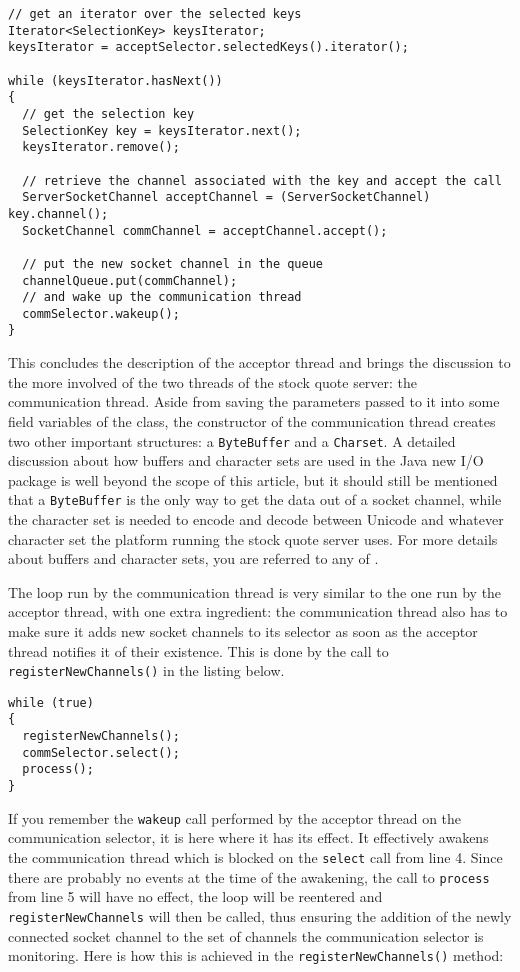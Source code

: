 \documentclass[a4paper,10pt]{article}
\begin{document}
\begin{lstlisting}
// get an iterator over the selected keys
Iterator<SelectionKey> keysIterator;
keysIterator = acceptSelector.selectedKeys().iterator();

while (keysIterator.hasNext())
{
  // get the selection key
  SelectionKey key = keysIterator.next();
  keysIterator.remove();

  // retrieve the channel associated with the key and accept the call
  ServerSocketChannel acceptChannel = (ServerSocketChannel) key.channel();
  SocketChannel commChannel = acceptChannel.accept();

  // put the new socket channel in the queue
  channelQueue.put(commChannel);
  // and wake up the communication thread
  commSelector.wakeup();
}
\end{lstlisting}

This concludes the description of the acceptor thread and brings the discussion to the more involved of the two
threads of the stock quote server: the communication thread. Aside from saving the parameters passed to it into
some field variables of the class, the constructor of the communication thread creates two other important structures:
a \texttt{ByteBuffer} and a \texttt{Charset}. A detailed discussion about how buffers and character sets are used in
the Java new I/O package is well beyond the scope of this article, but it should still be mentioned that a \texttt{ByteBuffer}
is the only way to get the data out of a socket channel, while the character set is needed to encode and decode
between Unicode and whatever character set the platform running the stock quote server uses. For more details
about buffers and character sets, you are referred to any of \cite{eckel98thinking, javadoc}.

The loop run by the communication thread is very similar to the one run by the acceptor thread, with one extra ingredient:
the communication thread also has to make sure it adds new socket channels to its selector as soon as the acceptor
thread notifies it of their existence. This is done by the call to \texttt{registerNewChannels()} in the listing below.

\begin{lstlisting}
while (true)
{
  registerNewChannels();
  commSelector.select();
  process();
}
\end{lstlisting}

If you remember the \texttt{wakeup} call performed by the acceptor thread on the communication selector, it is
here where it has its effect. It effectively awakens the communication thread which is blocked on the \texttt{select}
call from line 4. Since there are probably no events at the time of the awakening, the call to \texttt{process} from
line 5 will have no effect, the loop will be reentered and \texttt{registerNewChannels} will then be called, thus
ensuring the addition of the newly connected socket channel to the set of channels the communication selector is
monitoring. Here is how this is achieved in the \texttt{registerNewChannels()} method:
\end{document}
